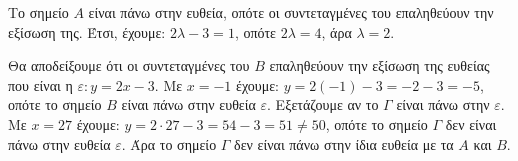 
\begin{alist}
\item Το σημείο $A$ είναι πάνω στην ευθεία, οπότε οι συντεταγμένες του επαληθεύουν την
εξίσωση της. Έτσι, έχουμε: $2\lambda - 3 = 1$, οπότε $2\lambda = 4$, άρα $\lambda = 2$.

\item Θα αποδείξουμε ότι οι συντεταγμένες του $B$ επαληθεύουν την εξίσωση της ευθείας που
είναι η $\varepsilon: y = 2x - 3$.
Με $x = -1$ έχουμε: $y = 2(-1) - 3 = -2 - 3 = -5$, οπότε το σημείο $B$ είναι πάνω στην ευθεία $\varepsilon$.
Εξετάζουμε αν το $\Gamma$ είναι πάνω στην $\varepsilon$.
Με $x = 27$ έχουμε: $y = 2 \cdot 27 - 3 = 54 - 3 = 51 \ne 50$, οπότε το σημείο $\Gamma$ δεν είναι πάνω στην ευθεία $\varepsilon$.
Άρα το σημείο $\Gamma$ δεν είναι πάνω στην ίδια ευθεία με τα $A$ και $B$.
\end{alist}

